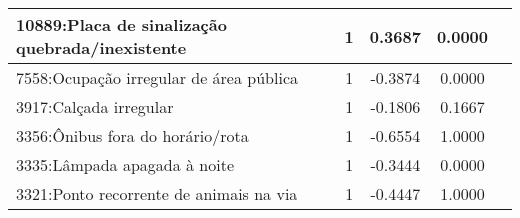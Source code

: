 \begin{table}[htbp]
\begin{tabular}{|l|c|c|c|c|}
		10889:Placa de sinalização quebrada/inexistente & 1                & 0.3687         & 0.0000           \\
		\hline
		7558:Ocupação irregular de área pública         & 1                & -0.3874        & 0.0000           \\
		\hline
		3917:Calçada irregular                          & 1                & -0.1806        & 0.1667           \\
		\hline
		3356:Ônibus fora do horário/rota                & 1                & -0.6554        & 1.0000           \\
		\hline
		3335:Lâmpada apagada à noite                    & 1                & -0.3444        & 0.0000           \\
		\hline
		3321:Ponto recorrente de animais na via         & 1                & -0.4447        & 1.0000           \\
		\hline
	\end{tabular}
\end{table}

